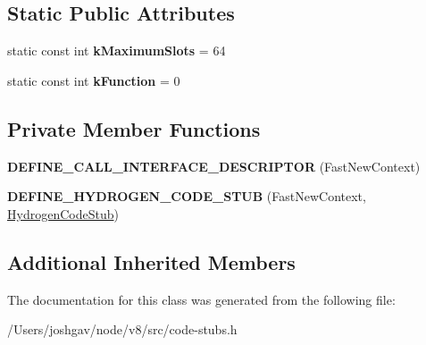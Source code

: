 \subsection*{Static Public Attributes}
\begin{DoxyCompactItemize}
\item 
static const int {\bfseries k\+Maximum\+Slots} = 64\hypertarget{classv8_1_1internal_1_1_fast_new_context_stub_a9773d00ed6c60b0746c31a98e887fbcb}{}\label{classv8_1_1internal_1_1_fast_new_context_stub_a9773d00ed6c60b0746c31a98e887fbcb}

\item 
static const int {\bfseries k\+Function} = 0\hypertarget{classv8_1_1internal_1_1_fast_new_context_stub_ade6de23efad461be0760ab3494b50433}{}\label{classv8_1_1internal_1_1_fast_new_context_stub_ade6de23efad461be0760ab3494b50433}

\end{DoxyCompactItemize}
\subsection*{Private Member Functions}
\begin{DoxyCompactItemize}
\item 
{\bfseries D\+E\+F\+I\+N\+E\+\_\+\+C\+A\+L\+L\+\_\+\+I\+N\+T\+E\+R\+F\+A\+C\+E\+\_\+\+D\+E\+S\+C\+R\+I\+P\+T\+OR} (Fast\+New\+Context)\hypertarget{classv8_1_1internal_1_1_fast_new_context_stub_a84e5dda1321910142976513d54be1e91}{}\label{classv8_1_1internal_1_1_fast_new_context_stub_a84e5dda1321910142976513d54be1e91}

\item 
{\bfseries D\+E\+F\+I\+N\+E\+\_\+\+H\+Y\+D\+R\+O\+G\+E\+N\+\_\+\+C\+O\+D\+E\+\_\+\+S\+T\+UB} (Fast\+New\+Context, \hyperlink{classv8_1_1internal_1_1_hydrogen_code_stub}{Hydrogen\+Code\+Stub})\hypertarget{classv8_1_1internal_1_1_fast_new_context_stub_ad8c2f0fcc5ebf798a63becf3fadec18a}{}\label{classv8_1_1internal_1_1_fast_new_context_stub_ad8c2f0fcc5ebf798a63becf3fadec18a}

\end{DoxyCompactItemize}
\subsection*{Additional Inherited Members}


The documentation for this class was generated from the following file\+:\begin{DoxyCompactItemize}
\item 
/\+Users/joshgav/node/v8/src/code-\/stubs.\+h\end{DoxyCompactItemize}
